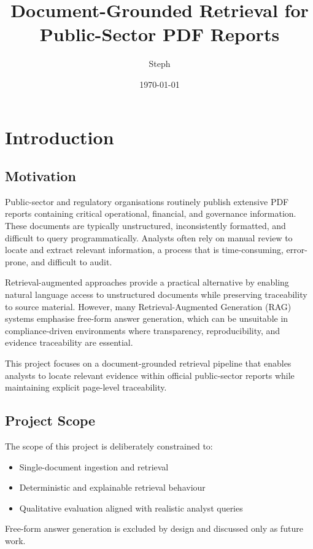 \documentclass[12pt,a4paper]{report}
\title{Document-Grounded Retrieval for Public-Sector PDF Reports}
\author{Steph}
\date{\today}
\begin{document}
\maketitle
\tableofcontents

\chapter{Introduction}

\section{Motivation}
Public-sector and regulatory organisations routinely publish extensive PDF reports containing critical operational, financial, and governance information. These documents are typically unstructured, inconsistently formatted, and difficult to query programmatically. Analysts often rely on manual review to locate and extract relevant information, a process that is time-consuming, error-prone, and difficult to audit.

Retrieval-augmented approaches provide a practical alternative by enabling natural language access to unstructured documents while preserving traceability to source material. However, many Retrieval-Augmented Generation (RAG) systems emphasise free-form answer generation, which can be unsuitable in compliance-driven environments where transparency, reproducibility, and evidence traceability are essential.

This project focuses on a document-grounded retrieval pipeline that enables analysts to locate relevant evidence within official public-sector reports while maintaining explicit page-level traceability.

\section{Project Scope}
The scope of this project is deliberately constrained to:
\begin{itemize}
  \item Single-document ingestion and retrieval
  \item Deterministic and explainable retrieval behaviour
  \item Qualitative evaluation aligned with realistic analyst queries
\end{itemize}
Free-form answer generation is excluded by design and discussed only as future work.
\end{document}

